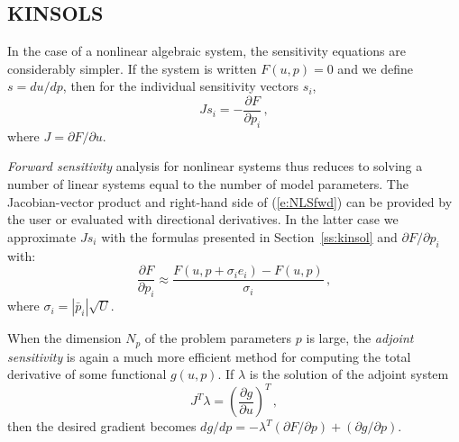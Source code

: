 
\subsection{KINSOLS}

In the case of a nonlinear algebraic system, the sensitivity
equations are considerably simpler.  If the system is written
$F(u,p) = 0$ and we define $s = d u / d p$, then for the
individual sensitivity vectors $s_i$,
\begin{equation}\label{e:NLSfwd}
  J s_i = -\frac{\partial F}{\partial p_i} \, ,
\end{equation}
where $ J = \partial F / \partial u$.

{\em Forward sensitivity} analysis for nonlinear systems thus reduces to solving a
number of linear systems equal to the number of model parameters.
The Jacobian-vector product and right-hand side of (\ref{e:NLSfwd}) can be provided
by the user or evaluated with directional derivatives. In the latter case
we approximate $J s_i$ with the formulas presented in Section~\ref{ss:kinsol}
and ${\partial F}/{\partial p_i}$ with:
\begin{equation*}
\frac{\partial F}{\partial p_i} \approx \frac{F(u,p + \sigma_i e_i)-
    F(u,p)}{\sigma_i} \, ,
\end{equation*}
where $\sigma_i = |{\bar p}_i| \sqrt{U}$.

When the dimension $N_p$ of the problem parameters $p$ is large, the
{\em adjoint sensitivity} is again a much more efficient method for computing
the total derivative of some functional $g(u,p)$. If $\lambda$ is the solution of
the adjoint system
\begin{equation*}
  J^T \lambda = \left( \frac{\partial g}{\partial u} \right)^T \, ,
\end{equation*}
then the desired gradient becomes
${dg}/{dp} = -\lambda^T ({\partial F}/{\partial p}) + ({\partial g}/{\partial p})$.
